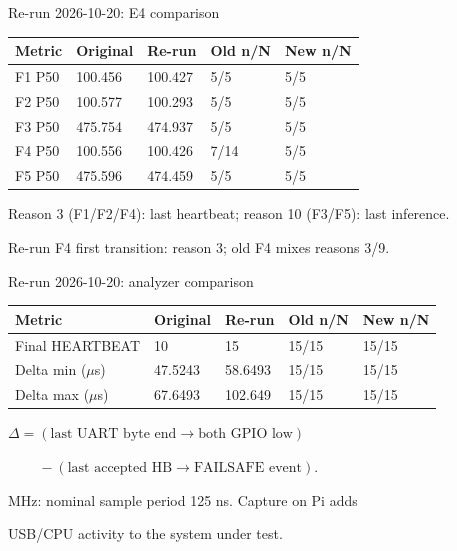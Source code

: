 \begin{frame}[t]{Re-run 2026-10-20: E4 comparison}
{\small\begin{tabular}{@{}lllll@{}}\toprule
Metric & Original & Re-run & Old n/N & New n/N \\\midrule
F1 P50 & 100.456 & 100.427 & 5/5 & 5/5 \\
F2 P50 & 100.577 & 100.293 & 5/5 & 5/5 \\
F3 P50 & 475.754 & 474.937 & 5/5 & 5/5 \\
F4 P50 & 100.556 & 100.426 & 7/14 & 5/5 \\
F5 P50 & 475.596 & 474.459 & 5/5 & 5/5 \\
\bottomrule\end{tabular}}\par\medskip
Reason 3 (F1/F2/F4): last heartbeat; reason 10 (F3/F5): last inference.\par
Re-run F4 first transition: reason 3; old F4 mixes reasons 3/9.
\end{frame}

\begin{frame}[t]{Re-run 2026-10-20: analyzer comparison}
{\small\begin{tabular}{@{}lllll@{}}\toprule
Metric & Original & Re-run & Old n/N & New n/N \\\midrule
Final HEARTBEAT & 10 & 15 & 15/15 & 15/15 \\
Delta min (\(\mu\)s) & 47.5243 & 58.6493 & 15/15 & 15/15 \\
Delta max (\(\mu\)s) & 67.6493 & 102.649 & 15/15 & 15/15 \\
\bottomrule\end{tabular}}\par\medskip
\(\Delta=(\text{last UART byte end}\to\text{both GPIO low})\)\par
\(\phantom{\Delta={}}-(\text{last accepted HB}\to\text{FAILSAFE event})\).\par{} MHz: nominal sample period 125 ns. Capture on Pi adds\par
USB/CPU activity to the system under test.
\end{frame}

